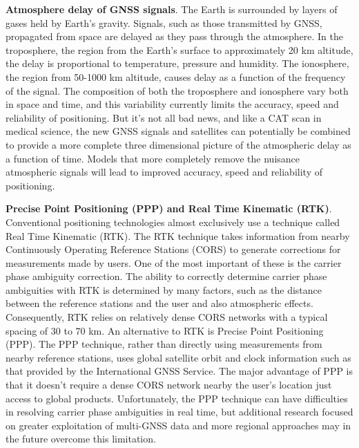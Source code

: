 \textbf{Atmosphere delay of GNSS signals}. The Earth is surrounded by layers of gases held by Earth's gravity. Signals, such as those transmitted by GNSS, propagated from space are delayed as they pass through the atmosphere. In the troposphere, the region from the Earth’s surface to approximately 20 km altitude, the delay is proportional to temperature, pressure and humidity. The ionosphere, the region from 50-1000 km altitude, causes delay as a function of the frequency of the signal. The composition of both the troposphere and ionosphere vary both in space and time, and this variability currently limits the accuracy, speed and reliability of positioning. But it’s not all bad news, and like a CAT scan in medical science, the new GNSS signals and satellites can potentially be combined to provide a more complete three dimensional picture of the atmospheric delay as a function of time. Models that more completely remove the nuisance atmospheric signals will lead to improved accuracy, speed and reliability of positioning.

\textbf{Precise Point Positioning (PPP) and Real Time Kinematic (RTK)}. Conventional positioning technologies almost exclusively use a technique called Real Time Kinematic (RTK). The RTK technique takes information from nearby Continuously Operating Reference Stations (CORS) to generate corrections for measurements made by users. One of the most important of these is the carrier phase ambiguity correction. The ability to correctly determine carrier phase ambiguities with RTK is determined by many factors, such as the distance between the reference stations and the user and also atmospheric effects. Consequently, RTK relies on relatively dense CORS networks with a typical spacing of 30 to 70 km. An alternative to RTK is Precise Point Positioning (PPP). The PPP technique, rather than directly using measurements from nearby reference stations, uses global satellite orbit and clock information such as that provided by the International GNSS Service. The major advantage of PPP is that it doesn’t require a dense CORS network nearby the user’s location just access to global products. Unfortunately, the PPP technique can have difficulties in resolving carrier phase ambiguities in real time, but additional research focused on greater exploitation of multi-GNSS data and more regional approaches may in the future overcome this limitation.